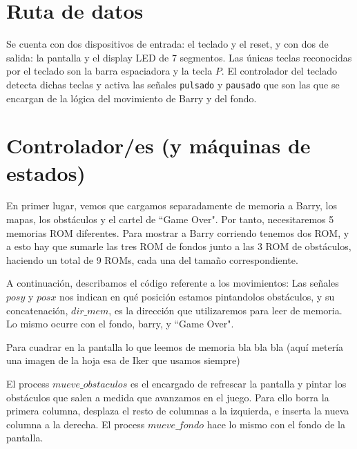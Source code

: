 \documentclass[11pt, a4paper, spanish, openright, twoside]{book}
\begin{document}
\newpage
\mbox{}
\thispagestyle{empty}						%
\newpage


\tableofcontents 							%

\newpage
\mbox{}
\thispagestyle{empty}						%
\newpage


\vspace{3cm}


\section{Ruta de datos}
Se cuenta con dos dispositivos de entrada: el teclado y el reset, y con dos de salida: la pantalla y el display LED de 7 segmentos. 
Las únicas teclas reconocidas por el teclado son la barra espaciadora y la tecla $P$. El controlador del teclado detecta dichas teclas y activa las señales \texttt{pulsado} y \texttt{pausado} que son las que se encargan de la lógica del movimiento de Barry y del fondo. 

\section{Controlador/es (y máquinas de estados)}
En primer lugar, vemos que cargamos separadamente de memoria a Barry,  los mapas, los obstáculos y el cartel de ``Game Over". Por tanto, necesitaremos 5 memorias ROM diferentes. Para mostrar a Barry corriendo tenemos dos ROM, y a esto hay que sumarle las tres ROM de fondos junto a las 3 ROM de obstáculos, haciendo un total de 9 ROMs, cada una del tamaño correspondiente. 

A continuación, describamos el código referente a los movimientos:
Las señales $posy$ y $posx$ nos indican en qué posición estamos pintandolos obstáculos, y su concatenación, $dir\_mem$, es la dirección que utilizaremos para leer de memoria. Lo mismo ocurre con el fondo, barry, y ``Game Over".

Para cuadrar en la pantalla lo que leemos de memoria bla bla bla (aquí metería una imagen de la hoja esa de Iker que usamos siempre)

El process $mueve\_obstaculos$ es el encargado de refrescar la pantalla y pintar los obstáculos que salen a medida que avanzamos en el juego. Para ello borra la primera columna, desplaza el resto de columnas a la izquierda, e inserta la nueva columna a la derecha. El process $mueve\_fondo$ hace lo mismo con el fondo de la pantalla.
\end{document}
